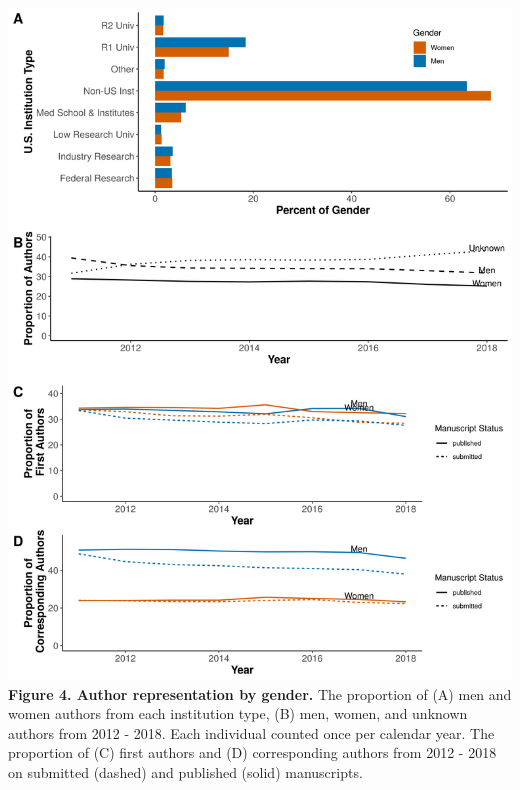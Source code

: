 \documentclass[11pt,]{article}
\begin{document}
\includegraphics{Figure_3.png} \textbf{Figure 4. Author representation
by gender.} The proportion of (A) men and women authors from each
institution type, (B) men, women, and unknown authors from 2012 - 2018.
Each individual counted once per calendar year. The proportion of (C)
first authors and (D) corresponding authors from 2012 - 2018 on
submitted (dashed) and published (solid) manuscripts.

\newpage
\end{document}
